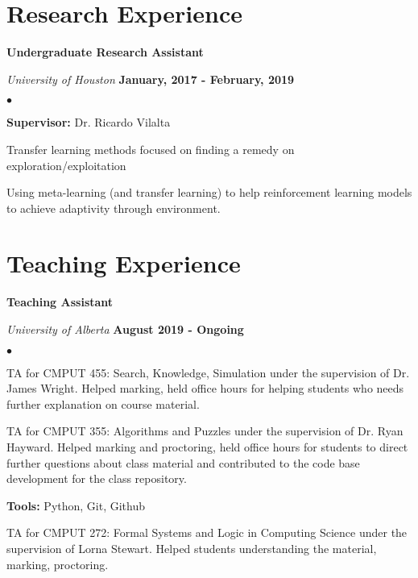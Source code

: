 \documentclass[margin,line]{res}
\newenvironment{list2}{
  \begin{list}{$\bullet$}{%
      \setlength{\itemsep}{0in}
      \setlength{\parsep}{0in} \setlength{\parskip}{0in}
      \setlength{\topsep}{0in} \setlength{\partopsep}{0in} 
      \setlength{\leftmargin}{0.2in}}}{\end{list}}
\begin{document}
\begin{resume}
\section{\sc Research Experience}

{\bf Undergraduate Research Assistant}

\vspace{-.3cm}
{\em University of Houston} \hfill {\bf January, 2017 - February, 2019}\\ 
\vspace{-.3cm}
\begin{list2}
\item \textbf{Supervisor:} Dr. Ricardo Vilalta
\item Transfer learning methods focused on finding a remedy on exploration/exploitation
\item Using meta-learning (and transfer learning) to help reinforcement learning models to achieve adaptivity through environment. 
\end{list2}

\section{\sc Teaching Experience}
{\bf Teaching Assistant}

\vspace{-.3cm}
{\em University of Alberta} \hfill {\bf August 2019 - Ongoing}\\
\begin{list2}
  \item TA for CMPUT 455: Search, Knowledge, Simulation under the supervision of Dr. James Wright. Helped marking, held office hours for helping students who needs further explanation on course material.

	\item TA for CMPUT 355: Algorithms and Puzzles under the supervision of Dr. Ryan Hayward. Helped marking and proctoring, held office hours for students to direct further questions about class material and contributed to the code base development for the class repository.
	
	\textbf{Tools:} Python, Git, Github
	\item TA for CMPUT 272: Formal Systems and Logic in Computing Science under the supervision of Lorna Stewart. Helped students understanding the material, marking, proctoring.
	
\end{list2}
\vspace*{.05in}


\end{resume}
\end{document}
